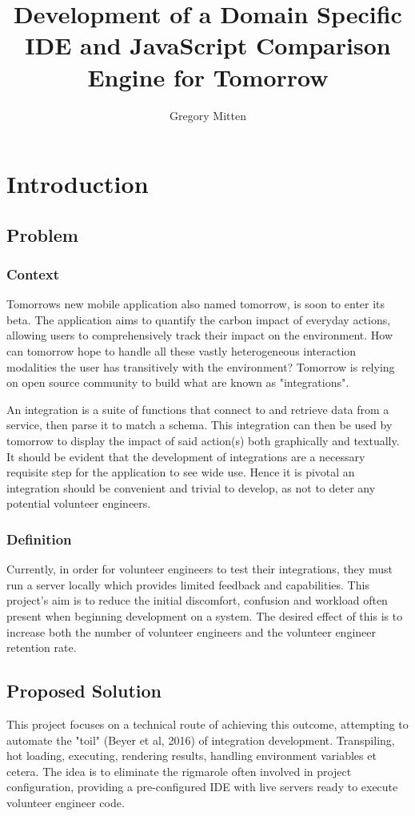 \documentclass[jou,apacite]{apa6}
\title{Development of a Domain Specific IDE and JavaScript Comparison Engine for Tomorrow}
\author{Gregory Mitten}
\affiliation{University of Sussex}
\begin{document}
\maketitle    
                        
\section{Introduction}
\subsection{Problem}
\subsubsection{Context}
Tomorrow\textquotesingle s new mobile application also named tomorrow, is soon to enter its beta. The application aims to quantify the carbon impact of everyday actions, allowing users to comprehensively track their impact on the environment. How can tomorrow hope to handle all these vastly heterogeneous interaction modalities the user has transitively with the environment? Tomorrow is relying on open source community to build what are known as "integrations".

An integration is a suite of functions that connect to and retrieve data from a service, then parse it to match a schema. This integration can then be used by tomorrow to display the impact of said action(s) both graphically and textually. It should be evident that the development of integrations are a necessary requisite step for the application to see wide use. Hence it is pivotal an integration should be convenient and trivial to develop, as not to deter any potential volunteer engineers.
\subsubsection{Definition}
Currently, in order for volunteer engineers to test their integrations, they must run a server locally which provides limited feedback and capabilities. This project’s aim is to reduce the initial discomfort, confusion and workload often present when beginning development on a system. The desired effect of this is to increase both the number of volunteer engineers and the volunteer engineer retention rate.

\subsection{Proposed Solution}
This project focuses on a technical route of achieving this outcome, attempting to automate the "toil" (Beyer et al, 2016) of integration development.  Transpiling, hot loading, executing, rendering results, handling environment variables et cetera. The idea is to eliminate the rigmarole often involved in project configuration, providing a pre-configured IDE with live servers ready to execute volunteer engineer code. 
\end{document}
